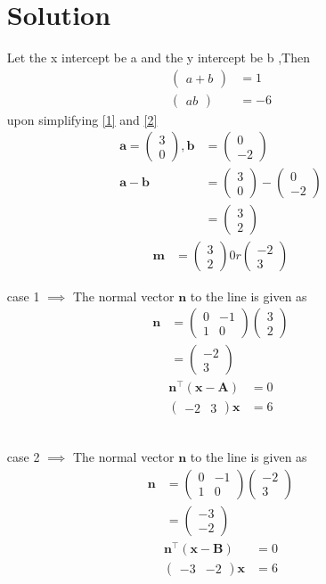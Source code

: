\documentclass[12pt]{article}
\providecommand{\brak}[1]{\ensuremath{\left(#1\right)}}
\newcommand{\myvec}[1]{\ensuremath{\begin{pmatrix}#1\end{pmatrix}}}
\let\vec\mathbf
\begin{document}
\begin{enumerate}
\section{Solution}
Let the x intercept be a and  the y intercept be b ,Then
\begin{align}
\myvec{a+b}&=1\label{1}\\
\myvec{ab}&=-6 \label{2}
\end{align}
upon simplifying \eqref{1} and \eqref{2}
\begin{align}
\vec{a}=\myvec{3\\0},\vec{b}&=\myvec{0\\-2}\\
\vec{a-b}&=\myvec{3\\0}-\myvec{0\\-2}\\
&=\myvec{3\\2}
\end{align}
\begin{align}		
\vec{m}&=\myvec{3\\2}0r \myvec{-2\\3}
\end{align}
\item[case 1]
$\implies$ The normal vector $\vec{n}$ to the line is given as
\begin{align}
\vec{n}&=\myvec{0&-1\\1&0}\myvec{3\\2}\\
&=\myvec{-2 \\3} 
\end{align}
\begin{align}
	\vec{n}^\top\brak{\vec{x}-\vec{A}} &= 0 \\
	\myvec { -2 & 3 } \vec{x}  &= 6  
\end{align}
\\
\item[case 2]
$\implies$ The normal vector $\vec{n}$ to the line is given as
\begin{align}
\vec{n}&=\myvec{0&-1\\1&0}\myvec{-2\\3}\\
&=\myvec{-3 \\-2} 
\end{align}
\begin{align}
    \vec{n}^\top\brak{\vec{x}-\vec{B}} &= 0 \\  
	\myvec { -3 & -2 }  \vec{x}  &= 6        
\end{align}

\end{enumerate}
\end{document}
